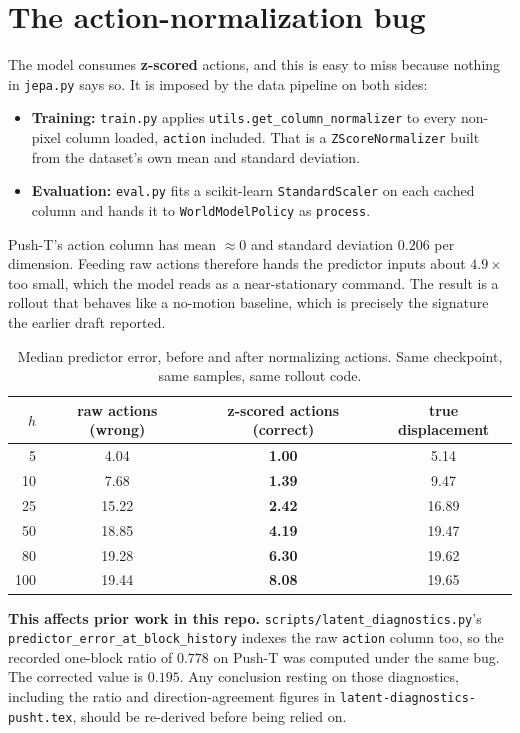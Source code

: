 \documentclass[11pt]{article}
\begin{document}
\section{The action-normalization bug}
\label{sec:actionnorm}

The model consumes \textbf{z-scored} actions, and this is easy to miss because nothing in
\texttt{jepa.py} says so. It is imposed by the data pipeline on both sides:

\begin{itemize}[leftmargin=1.4em,itemsep=2pt]
\item \textbf{Training:} \texttt{train.py} applies \texttt{utils.get\_column\_normalizer} to
every non-pixel column loaded, \texttt{action} included. That is a
\texttt{ZScoreNormalizer} built from the dataset's own mean and standard deviation.
\item \textbf{Evaluation:} \texttt{eval.py} fits a scikit-learn \texttt{StandardScaler} on
each cached column and hands it to \texttt{WorldModelPolicy} as \texttt{process}.
\end{itemize}

Push-T's action column has mean $\approx 0$ and standard deviation $\mathbf{0.206}$ per
dimension. Feeding raw actions therefore hands the predictor inputs about $\mathbf{4.9\times}$
too small, which the model reads as a near-stationary command. The result is a rollout that
behaves like a no-motion baseline, which is precisely the signature the earlier draft
reported.

\begin{table}[H]
\centering
\small
\caption{Median predictor error, before and after normalizing actions. Same checkpoint, same
samples, same rollout code.}
\begin{tabular}{rccc}
\toprule
$h$ & raw actions (wrong) & z-scored actions (correct) & true displacement \\
\midrule
5   & 4.04  & \textbf{1.00} & 5.14 \\
10  & 7.68  & \textbf{1.39} & 9.47 \\
25  & 15.22 & \textbf{2.42} & 16.89 \\
50  & 18.85 & \textbf{4.19} & 19.47 \\
80  & 19.28 & \textbf{6.30} & 19.62 \\
100 & 19.44 & \textbf{8.08} & 19.65 \\
\bottomrule
\end{tabular}
\end{table}

\textbf{This affects prior work in this repo.} \texttt{scripts/latent\_diagnostics.py}'s
\texttt{predictor\_error\_at\_block\_history} indexes the raw \texttt{action} column too, so
the recorded one-block ratio of $0.778$ on Push-T was computed under the same bug. The
corrected value is $\mathbf{0.195}$. Any conclusion resting on those diagnostics, including
the ratio and direction-agreement figures in \texttt{latent-diagnostics-pusht.tex}, should be
re-derived before being relied on.
\end{document}
